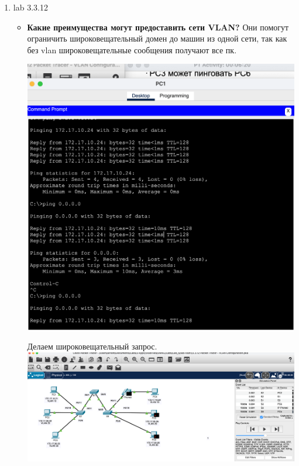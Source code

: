 \documentclass[a4paper,14pt]{extarticle}
\begin{document}
\begin{enumerate}
\begin{itemize}
        \end{itemize}
        \newpage
        \item lab 3.3.12
        \begin{itemize}
            \item \textbf{Какие преимущества могут предоставить сети VLAN?}
                Они помогут ограничить широковещательный домен до машин из одной сети, так как без vlan широковещательные сообщения получают все пк.
                \begin{center}
                    \includegraphics[scale=0.5]{pics/3.3.12_2.png}
                    
                    Делаем широковещательный запрос.
                    \includegraphics[scale=0.3]{pics/3.3.12_1.png}
                \end{center}


\end{itemize}
\end{enumerate}
\end{document}
